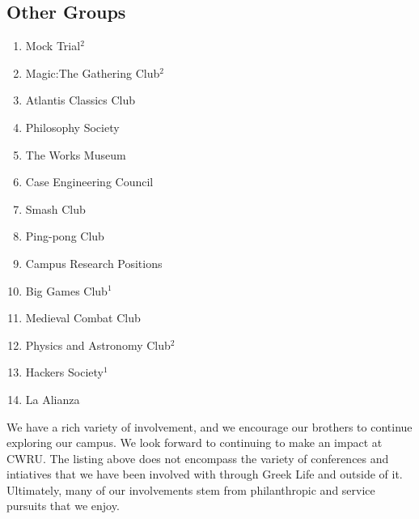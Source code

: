     \subsection*{Other Groups}
      \begin{enumerate}
	\item Mock Trial$^2$
	\item Magic:The Gathering Club$^2$
	\item Atlantis Classics Club
	\item Philosophy Society
	\item The Works Museum
	\item Case Engineering Council
	\item Smash Club
	\item Ping-pong Club
	\item Campus Research Positions
	\item Big Games Club$^1$
	\item Medieval Combat Club
	\item Physics and Astronomy Club$^2$
	\item Hackers Society$^1$
	\item La Alianza	
      \end{enumerate}

  We have a rich variety of involvement, and we encourage our brothers to continue exploring our campus. We look forward to continuing to make an impact at CWRU. The listing above does not encompass the variety of conferences and intiatives that we have been involved with through Greek Life and outside of it. Ultimately, many of our involvements stem from philanthropic and service pursuits that we enjoy.
